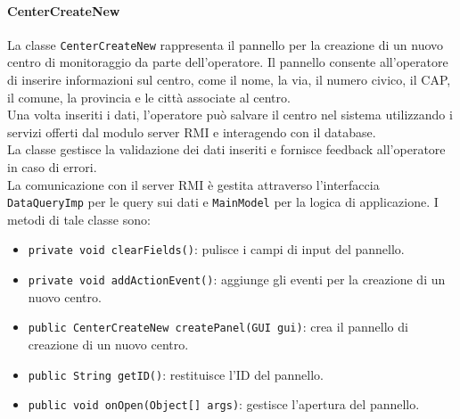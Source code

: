 \paragraph{CenterCreateNew}
La classe \texttt{CenterCreateNew} rappresenta il pannello per la creazione di un nuovo centro di monitoraggio da parte dell'operatore.
Il pannello consente all'operatore di inserire informazioni sul centro, come il nome, la via, il numero civico, il CAP, il comune, la provincia e le città associate al centro.\\
Una volta inseriti i dati, l'operatore può salvare il centro nel sistema utilizzando i servizi offerti dal modulo server RMI e interagendo con il database.\\
La classe gestisce la validazione dei dati inseriti e fornisce feedback all'operatore in caso di errori.\\
La comunicazione con il server RMI è gestita attraverso l'interfaccia \texttt{DataQueryImp} per le query sui dati e \texttt{MainModel} per la logica di applicazione.
I metodi di tale classe sono:
\begin{itemize}
    \item \texttt{private void clearFields()}: pulisce i campi di input del pannello.
    \item \texttt{private void addActionEvent()}: aggiunge gli eventi per la creazione di un nuovo centro.
    \item \texttt{public CenterCreateNew createPanel(GUI gui)}: crea il pannello di creazione di un nuovo centro.
    \item \texttt{public String getID()}: restituisce l'ID del pannello.
    \item \texttt{public void onOpen(Object[] args)}: gestisce l'apertura del pannello.
\end{itemize}

